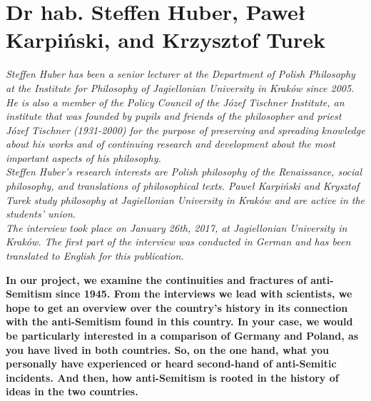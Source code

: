 \section{Dr hab. Steffen Huber, Paweł Karpiński, and Krzysztof Turek}

\textit{Steffen Huber has been a senior lecturer at the Department of Polish Philosophy at the Institute for Philosophy of Jagiellonian University in Kraków since 2005. He is also a member of the Policy Council of the Józef Tischner Institute, an institute that was founded by pupils and friends of the philosopher and priest Józef Tischner (1931-2000) for the purpose of preserving and spreading knowledge about his works and of continuing research and development about the most important aspects of his philosophy.\\ 
Steffen Huber’s research interests are Polish philosophy of the Renaissance, social philosophy, and translations of philosophical texts. 
Paweł Karpiński and Krysztof Turek study philosophy at Jagiellonian University in Kraków and are active in the students' union.\\ 
The interview took place on January 26th, 2017, at Jagiellonian University in Kraków. The first part of the interview was conducted in German and has been translated to English for this publication.}\par
\vspace*{2em}
\textbf{In our project, we examine the continuities and fractures of anti-Semitism since 1945. From the interviews we lead with scientists, we hope to get an overview over the country's history in its connection with the anti-Semitism found in this country. In your case, we would be particularly interested in a comparison of Germany and Poland, as you have lived in both countries. So, on the one hand, what you personally have experienced or heard second-hand of anti-Semitic incidents. And then, how anti-Semitism is rooted in the history of ideas in the two countries.} 

